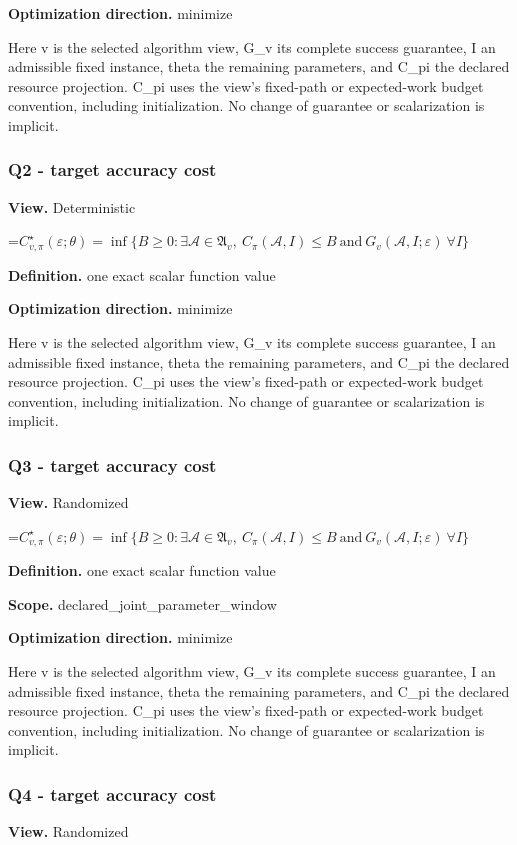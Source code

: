 \documentclass[10pt,a4paper]{article}
\newcommand{\AtlasMath}[1]{\par\begingroup\centering\setbox0=\hbox{$\displaystyle #1$}\ifdim\wd0>1.4\linewidth\typeout{ATLAS WIDE FORMULA: \the\wd0}\fi\ifdim\wd0>\linewidth\resizebox{\linewidth}{!}{\box0}\else\box0\fi\par\endgroup}
\begin{document}
\textbf{Optimization direction.} minimize

Here v is the selected algorithm view, G\_v its complete success guarantee, I an admissible fixed instance, theta the remaining parameters, and C\_pi the declared resource projection. C\_pi uses the view's fixed-path or expected-work budget convention, including initialization. No change of guarantee or scalarization is implicit.

\subsubsection{Q2 - target accuracy cost}
\textbf{View.} Deterministic

\AtlasMath{C^\star_{v,\pi}(\varepsilon;\theta)=\inf\{B\ge0:\exists\mathcal A\in\mathfrak A_v,\ C_\pi(\mathcal A,I)\le B\ \text{and}\ G_v(\mathcal A,I;\varepsilon)\ \forall I\}}
\textbf{Definition.} one exact scalar function value

\textbf{Optimization direction.} minimize

Here v is the selected algorithm view, G\_v its complete success guarantee, I an admissible fixed instance, theta the remaining parameters, and C\_pi the declared resource projection. C\_pi uses the view's fixed-path or expected-work budget convention, including initialization. No change of guarantee or scalarization is implicit.

\subsubsection{Q3 - target accuracy cost}
\textbf{View.} Randomized

\AtlasMath{C^\star_{v,\pi}(\varepsilon;\theta)=\inf\{B\ge0:\exists\mathcal A\in\mathfrak A_v,\ C_\pi(\mathcal A,I)\le B\ \text{and}\ G_v(\mathcal A,I;\varepsilon)\ \forall I\}}
\textbf{Definition.} one exact scalar function value

\textbf{Scope.} declared\_joint\_parameter\_window

\textbf{Optimization direction.} minimize

Here v is the selected algorithm view, G\_v its complete success guarantee, I an admissible fixed instance, theta the remaining parameters, and C\_pi the declared resource projection. C\_pi uses the view's fixed-path or expected-work budget convention, including initialization. No change of guarantee or scalarization is implicit.

\subsubsection{Q4 - target accuracy cost}
\textbf{View.} Randomized
\end{document}
